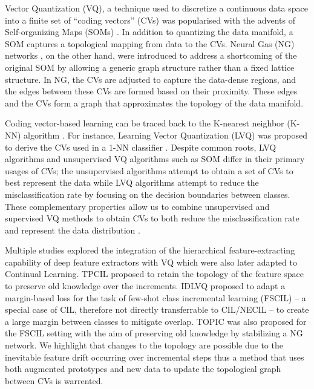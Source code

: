 \documentclass[10pt,twocolumn,letterpaper]{article}
\begin{document}
Vector Quantization (VQ), a technique used to discretize a continuous data space into a finite set of ``coding vectors'' (CVs) was popularised with the advents of Self-organizing Maps (SOMs) \cite{Kohonen1990TheMap}. In addition to quantizing the data manifold, a SOM captures a topological mapping from data to the CVs. Neural Gas (NG) networks \cite{ThomasMartinetzandKlausSchulten1991ATopologies,Fritzke1994ATopologies}, on the other hand, were introduced to address a shortcoming of the original SOM by allowing a generic graph structure rather than a fixed lattice structure. In NG, the CVs are adjusted to capture the data-dense regions, and the edges between these CVs are formed based on their proximity. These edges and the CVs form a graph that approximates the topology of the data manifold. 



Coding vector-based learning can be traced back to the K-nearest neighbor (K-NN) algorithm \cite{Fix1989DiscriminatoryProperties}. 
For instance, Learning Vector Quantization (LVQ) was proposed to derive the CVs used in a 1-NN classifier \cite{Kohonen1990ImprovedQuantization, Sato1996GeneralizedQuantization}.
Despite common roots, LVQ algorithms and unsupervised VQ algorithms such as SOM differ in their primary usages of CVs; the unsupervised algorithms attempt to obtain a set of CVs to best represent the data while LVQ algorithms attempt to reduce the misclassification rate by focusing on the decision boundaries between classes. These complementary properties allow us to combine unsupervised and supervised VQ methods \cite{Hammer2005SupervisedMeasure,DeVries2016DeepQuantization} to obtain CVs to both reduce the misclassification rate and represent the data distribution \cite{Kohonen1990TheMap}.




Multiple studies explored the integration of the hierarchical feature-extracting capability of deep feature extractors with VQ \cite{DeVries2016DeepQuantization, Villmann2017FusionLearning,Blaes2017Few-shotPrototyping} which were also later adapted to Continual Learning. TPCIL \cite{Tao2020Topology-PreservingClassificatio} proposed to retain the topology of the feature space to preserve old knowledge over the increments. IDLVQ \cite{Chen2021IncrementalSpace} proposed to adapt a margin-based loss for the task of few-shot class incremental learning (FSCIL) -- a special case of CIL, therefore not directly transferrable to CIL/NECIL -- to create a large margin between classes to mitigate overlap. TOPIC \cite{Tao2020Few-ShotLearning} was also proposed for the FSCIL setting with the aim of preserving old knowledge by stabilizing a NG network. 
We highlight that changes to the topology are possible due to the inevitable feature drift occurring over incremental steps thus a method that uses both augmented prototypes and new data to update the topological graph between CVs is warrented.
\end{document}
